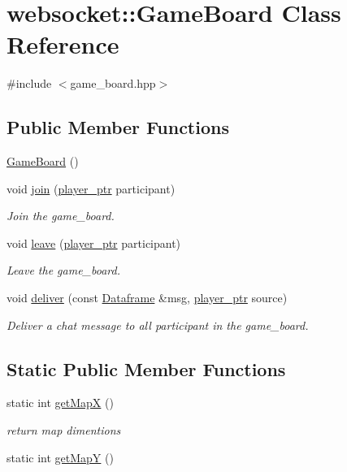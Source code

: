 \hypertarget{classwebsocket_1_1GameBoard}{}\section{websocket\+:\+:Game\+Board Class Reference}
\label{classwebsocket_1_1GameBoard}


{\ttfamily \#include $<$game\+\_\+board.\+hpp$>$}

\subsection*{Public Member Functions}
\begin{DoxyCompactItemize}
\item 
\hyperlink{classwebsocket_1_1GameBoard_a8093c83a31dd38e3edf1bc07de4b060a}{Game\+Board} ()
\item 
void \hyperlink{classwebsocket_1_1GameBoard_a3ca61a3da72869402a6e1702a99faa76}{join} (\hyperlink{namespacewebsocket_aec8d52893bdf524a1412533a63b006a3}{player\+\_\+ptr} participant)
\begin{DoxyCompactList}\small\item\em Join the game\+\_\+board. \end{DoxyCompactList}\item 
void \hyperlink{classwebsocket_1_1GameBoard_a2f3f0eb3fb2fbe6303426c1bc8d3fff7}{leave} (\hyperlink{namespacewebsocket_aec8d52893bdf524a1412533a63b006a3}{player\+\_\+ptr} participant)
\begin{DoxyCompactList}\small\item\em Leave the game\+\_\+board. \end{DoxyCompactList}\item 
void \hyperlink{classwebsocket_1_1GameBoard_a0ed4b13ba573956d8aebaf8f5c208fa0}{deliver} (const \hyperlink{structwebsocket_1_1Dataframe}{Dataframe} \&msg, \hyperlink{namespacewebsocket_aec8d52893bdf524a1412533a63b006a3}{player\+\_\+ptr} source)
\begin{DoxyCompactList}\small\item\em Deliver a chat message to all participant in the game\+\_\+board. \end{DoxyCompactList}\end{DoxyCompactItemize}
\subsection*{Static Public Member Functions}
\begin{DoxyCompactItemize}
\item 
static int \hyperlink{classwebsocket_1_1GameBoard_a3e8a7dec314f570a1d8cf92d4a711bd5}{get\+MapX} ()
\begin{DoxyCompactList}\small\item\em return map dimentions \end{DoxyCompactList}\item 
static int \hyperlink{classwebsocket_1_1GameBoard_a4f2dd5ab46f74a995388687dd6a5f440}{get\+MapY} ()
\end{DoxyCompactItemize}
